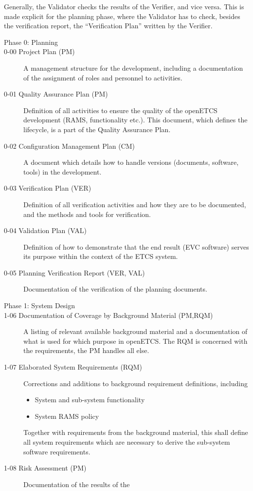 \documentclass{template/openetcs_article}
\begin{document}
Generally, the Validator checks the results of the Verifier, and vice
versa. This is made explicit for the planning phase, where the
Validator has to check, besides the verification report, the
``Verification Plan'' written by the Verifier.
%
\begin{description}
\item[Phase 0: Planning]
\item[0-00 Project Plan (PM)] A management structure for the development,
  including a documentation of the assignment of roles and personnel to activities.
\item[0-01 Quality Assurance Plan (PM)] Definition of all activities to
  ensure the quality of the openETCS development (RAMS, functionality
  etc.). This document, which defines the lifecycle, is a part of the Quality
  Assurance Plan.
\item[0-02 Configuration Management Plan (CM)] A document which details how to handle
  versions (documents, software, tools) in the development.
\item[0-03 Verification Plan (VER)] Definition of all verification
  activities and how they are to be documented, and the methods and
  tools for verification.
\item[0-04 Validation Plan (VAL)] Definition of how to demonstrate that the end result (EVC
  software) serves its purpose within the context of the ETCS system.
\item[0-05 Planning Verification Report (VER, VAL)]
  Documentation of the verification of the planning documents.
\item[Phase 1: System Design] 
\item[1-06 Documentation of Coverage by Background Material (PM,RQM)] A
  listing of relevant available background material and a
  documentation of what is used for which purpose in openETCS. The RQM is
  concerned with the requirements, the PM handles all else. 
\item[1-07 Elaborated System Requirements (RQM)] Corrections and additions to
  background requirement definitions, including
  \begin{itemize}
  \item System and sub-system functionality
  \item System RAMS policy
  \end{itemize}
  Together with requirements from the background material, this shall
  define all system requirements which are necessary to derive
  the sub-system software requirements. 
\item[1-08 Risk Assessment (PM)] Documentation of the results of the

\end{description}
\end{document}
